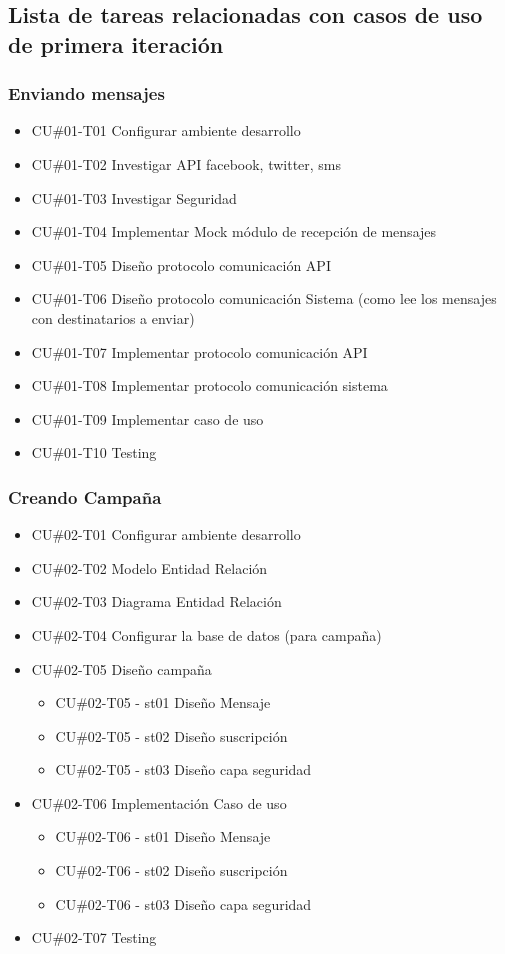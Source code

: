 \documentclass[a4paper, 11pt]{article}
\begin{document}
\subsection{Lista de tareas relacionadas con casos de uso de primera iteraci\'on}
\subsubsection{Enviando mensajes}
\begin{itemize}
\item{CU\#01-T01} Configurar ambiente desarrollo
\item{CU\#01-T02} Investigar API facebook, twitter, sms
\item{CU\#01-T03} Investigar Seguridad
\item{CU\#01-T04} Implementar Mock m\'odulo de recepci\'on de mensajes
\item{CU\#01-T05} Dise\~no protocolo comunicaci\'on API 
\item{CU\#01-T06} Dise\~no protocolo comunicaci\'on Sistema  (como lee los mensajes con destinatarios a enviar)
\item{CU\#01-T07} Implementar protocolo comunicaci\'on API
\item{CU\#01-T08} Implementar protocolo comunicaci\'on sistema
\item{CU\#01-T09} Implementar caso de uso
\item{CU\#01-T10} Testing
\end{itemize}

\subsubsection{Creando Campa\~na}
\begin{itemize}
\item{CU\#02-T01} Configurar ambiente desarrollo
\item{CU\#02-T02} Modelo Entidad Relaci\'on
\item{CU\#02-T03} Diagrama Entidad Relaci\'on
\item{CU\#02-T04} Configurar la base de datos (para campa\~na)
\item{CU\#02-T05} Dise\~no campa\~na
\begin{itemize}
\item{CU\#02-T05 - st01} Dise\~no Mensaje
\item{CU\#02-T05 - st02} Dise\~no suscripci\'on
\item{CU\#02-T05 - st03} Dise\~no capa seguridad
\end{itemize}
\item{CU\#02-T06} Implementaci\'on Caso de uso
\begin{itemize}
\item{CU\#02-T06 - st01} Dise\~no Mensaje
\item{CU\#02-T06 - st02} Dise\~no suscripci\'on
\item{CU\#02-T06 - st03} Dise\~no capa seguridad
\end{itemize}
\item{CU\#02-T07} Testing
\end{itemize}
\end{document}
